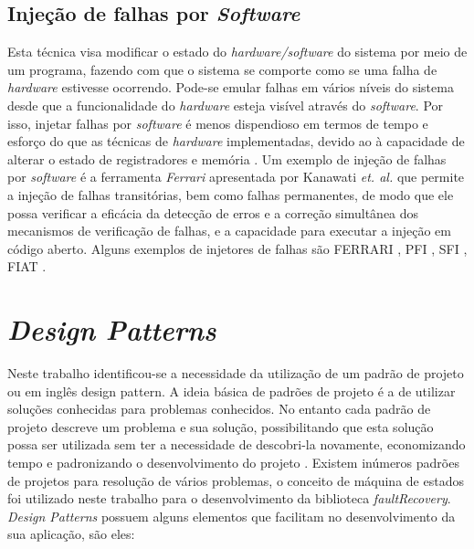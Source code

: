 \subsection{Injeção de falhas por \textit{Software}}

Esta técnica visa modificar o estado do \textit{hardware/software} do sistema por meio de um programa, fazendo com que o sistema se comporte como se uma falha de \textit{hardware} estivesse ocorrendo. Pode-se emular falhas em vários níveis do sistema desde que a funcionalidade do \textit{hardware} esteja visível através do \textit{software}. Por isso, injetar falhas por \textit{software} é menos dispendioso em termos de tempo e esforço do que as técnicas de \textit{hardware} implementadas, devido ao à capacidade de alterar o estado de registradores e memória \cite{Kanawati:1995}. Um exemplo de injeção de falhas por \textit{software} é a ferramenta \textit{Ferrari} apresentada por Kanawati \textit{et. al.} \cite{Kanawati:1995} que permite a injeção de falhas transitórias, bem como falhas permanentes, de modo que ele possa verificar a eficácia da detecção de erros e a correção simultânea dos mecanismos de verificação de falhas, e a capacidade para executar a injeção em código aberto. Alguns exemplos de injetores de falhas são FERRARI \cite{Kanawati:1995}, PFI \cite{Dawson:1995}, SFI \cite{Rosenberg:1993}, FIAT \cite{Segall:1988}. 


\section{\textit{Design Patterns}} \label{sec:designPattern}				
Neste trabalho identificou-se a necessidade da utilização de um padrão de projeto ou em inglês design pattern. A ideia básica de padrões de projeto é a de utilizar soluções conhecidas para problemas conhecidos. No entanto cada padrão de projeto descreve um problema e sua solução, possibilitando que esta solução possa ser utilizada sem ter a necessidade de descobri-la novamente, economizando tempo e padronizando o desenvolvimento do projeto \cite{Vinicius:2009}. Existem inúmeros padrões de projetos para resolução de vários problemas, o conceito de máquina de estados foi utilizado neste trabalho \cite{Engholm:2010} para o desenvolvimento da biblioteca \textit{faultRecovery}. \textit{Design Patterns} possuem alguns elementos que facilitam no desenvolvimento da sua aplicação, são eles:


